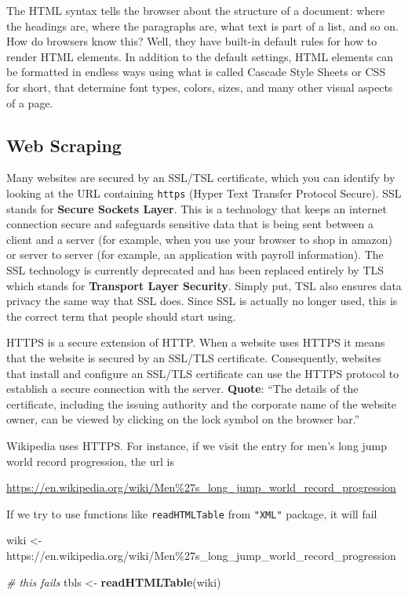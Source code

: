 \documentclass[
]{book}
\newenvironment{Shaded}{\begin{snugshade}}{\end{snugshade}}
\newcommand{\CommentTok}[1]{\textcolor[rgb]{0.56,0.35,0.01}{\textit{#1}}}
\newcommand{\FunctionTok}[1]{\textcolor[rgb]{0.13,0.29,0.53}{\textbf{#1}}}
\newcommand{\NormalTok}[1]{#1}
\newcommand{\OtherTok}[1]{\textcolor[rgb]{0.56,0.35,0.01}{#1}}
\newcommand{\StringTok}[1]{\textcolor[rgb]{0.31,0.60,0.02}{#1}}
\begin{document}
The HTML syntax tells the browser about the structure of a document: where
the headings are, where the paragraphs are, what text is part of a list, and
so on. How do browsers know this? Well, they have built-in default rules
for how to render HTML elements. In addition to the default settings, HTML
elements can be formatted in endless ways using what is called Cascade
Style Sheets or CSS for short, that determine font types, colors, sizes, and
many other visual aspects of a page.

\hypertarget{web-scraping}{%
\subsection{Web Scraping}\label{web-scraping}}

Many websites are secured by an SSL/TSL certificate, which you can identify by
looking at the URL containing \texttt{https} (Hyper Text Transfer Protocol Secure).
SSL stands for \textbf{Secure Sockets Layer}. This is a technology that
keeps an internet connection secure and safeguards sensitive data that is being
sent between a client and a server (for example, when you use your browser
to shop in amazon) or server to server (for example, an application with
payroll information). The SSL technology is currently deprecated and has been
replaced entirely by TLS which stands for \textbf{Transport Layer Security}. Simply
put, TSL also ensures data privacy the same way that SSL does. Since SSL is
actually no longer used, this is the correct term that people should start using.

HTTPS is a secure extension of HTTP. When a website uses HTTPS it means that
the website is secured by an SSL/TLS certificate. Consequently, websites that
install and configure an SSL/TLS certificate can use the HTTPS protocol to
establish a secure connection with the server.
\textbf{Quote}: ``The details of the certificate, including the issuing
authority and the corporate name of the website owner, can be viewed by
clicking on the lock symbol on the browser bar.''

Wikipedia uses HTTPS. For instance, if we visit the entry for men's long jump
world record progression, the url is

\url{https://en.wikipedia.org/wiki/Men\%27s_long_jump_world_record_progression}

If we try to use functions like \texttt{readHTMLTable} from \texttt{"XML"} package, it will
fail

\begin{Shaded}
\begin{Highlighting}[]
\NormalTok{wiki }\OtherTok{\textless{}{-}} \StringTok{\textquotesingle{}https://en.wikipedia.org/wiki/Men\%27s\_long\_jump\_world\_record\_progression\textquotesingle{}}

\CommentTok{\# this fails}
\NormalTok{tbls }\OtherTok{\textless{}{-}} \FunctionTok{readHTMLTable}\NormalTok{(wiki)}
\end{Highlighting}
\end{Shaded}
\end{document}
